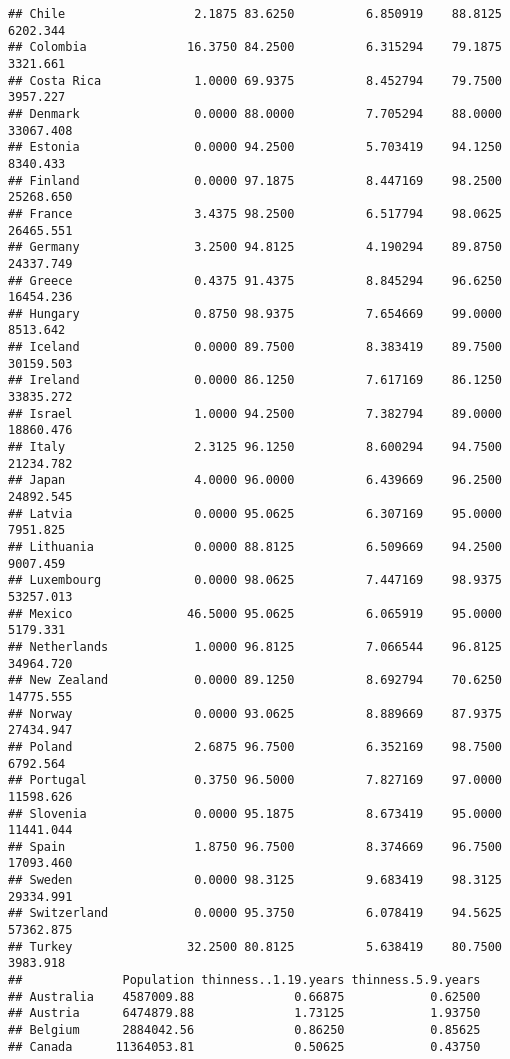 \documentclass[
]{article}
\begin{document}
\begin{verbatim}
## Chile                  2.1875 83.6250          6.850919    88.8125  6202.344
## Colombia              16.3750 84.2500          6.315294    79.1875  3321.661
## Costa Rica             1.0000 69.9375          8.452794    79.7500  3957.227
## Denmark                0.0000 88.0000          7.705294    88.0000 33067.408
## Estonia                0.0000 94.2500          5.703419    94.1250  8340.433
## Finland                0.0000 97.1875          8.447169    98.2500 25268.650
## France                 3.4375 98.2500          6.517794    98.0625 26465.551
## Germany                3.2500 94.8125          4.190294    89.8750 24337.749
## Greece                 0.4375 91.4375          8.845294    96.6250 16454.236
## Hungary                0.8750 98.9375          7.654669    99.0000  8513.642
## Iceland                0.0000 89.7500          8.383419    89.7500 30159.503
## Ireland                0.0000 86.1250          7.617169    86.1250 33835.272
## Israel                 1.0000 94.2500          7.382794    89.0000 18860.476
## Italy                  2.3125 96.1250          8.600294    94.7500 21234.782
## Japan                  4.0000 96.0000          6.439669    96.2500 24892.545
## Latvia                 0.0000 95.0625          6.307169    95.0000  7951.825
## Lithuania              0.0000 88.8125          6.509669    94.2500  9007.459
## Luxembourg             0.0000 98.0625          7.447169    98.9375 53257.013
## Mexico                46.5000 95.0625          6.065919    95.0000  5179.331
## Netherlands            1.0000 96.8125          7.066544    96.8125 34964.720
## New Zealand            0.0000 89.1250          8.692794    70.6250 14775.555
## Norway                 0.0000 93.0625          8.889669    87.9375 27434.947
## Poland                 2.6875 96.7500          6.352169    98.7500  6792.564
## Portugal               0.3750 96.5000          7.827169    97.0000 11598.626
## Slovenia               0.0000 95.1875          8.673419    95.0000 11441.044
## Spain                  1.8750 96.7500          8.374669    96.7500 17093.460
## Sweden                 0.0000 98.3125          9.683419    98.3125 29334.991
## Switzerland            0.0000 95.3750          6.078419    94.5625 57362.875
## Turkey                32.2500 80.8125          5.638419    80.7500  3983.918
##              Population thinness..1.19.years thinness.5.9.years
## Australia    4587009.88              0.66875            0.62500
## Austria      6474879.88              1.73125            1.93750
## Belgium      2884042.56              0.86250            0.85625
## Canada      11364053.81              0.50625            0.43750

\end{verbatim}
\end{document}
